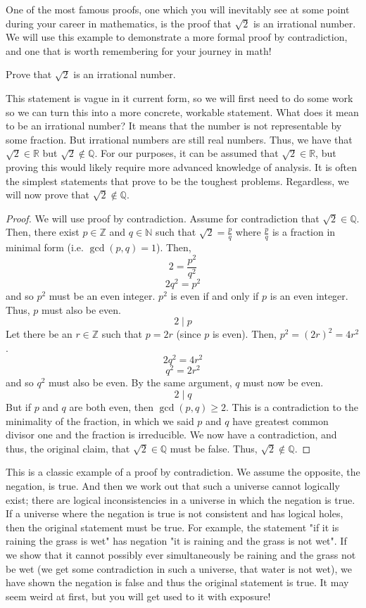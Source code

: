 One of the most famous proofs, one which you will inevitably see at some point during your career in mathematics, is the proof that $\sqrt{2}$ is an irrational number. We will use this example to demonstrate a more formal proof by contradiction, and one that is worth remembering for your journey in math!

\begin{example}
    Prove that $\sqrt{2}$ is an irrational number. 
\end{example}

This statement is vague in it current form, so we will first need to do some work so we can turn this into a more concrete, workable statement. What does it mean to be an irrational number? It means that the number is not representable by some fraction. But irrational numbers are still real numbers. Thus, we have that $\sqrt{2} \in \mathbb{R}$ but $\sqrt{2} \notin \mathbb{Q}$. For our purposes, it can be assumed that $\sqrt{2} \in \mathbb{R}$, but proving this would likely require more advanced knowledge of analysis. It is often the simplest statements that prove to be the toughest problems. Regardless, we will now prove that $\sqrt{2} \notin \mathbb{Q}$. 

\begin{proof}
We will use proof by contradiction. Assume for contradiction that $\sqrt{2} \in \mathbb{Q}$. Then, there exist $p \in \mathbb{Z}$ and $q \in \mathbb{N}$ such that $\sqrt{2} = \frac{p}{q}$ where $\frac{p}{q}$ is a fraction in minimal form (i.e. $\gcd(p, q) = 1$). Then,
\[
2 = \frac{p^2}{q^2}
\]
\[
2q^2 = p^2
\]
and so $p^2$ must be an even integer. $p^2$ is even if and only if $p$ is an even integer. Thus, $p$ must also be even.
\[
2 \mid p
\]
Let there be an $r \in \mathbb{Z}$ such that $p = 2r$ (since $p$ is even). Then, $p^2 = (2r)^2 = 4r^2$. 
\[
2q^2 = 4r^2
\]
\[
q^2 = 2r^2
\]
and so $q^2$ must also be even. By the same argument, $q$ must now be even.
\[
2 \mid q
\]
But if $p$ and $q$ are both even, then $\gcd(p, q) \geq 2$. This is a contradiction to the minimality of the fraction, in which we said $p$ and $q$ have greatest common divisor one and the fraction is irreducible. We now have a contradiction, and thus, the original claim, that $\sqrt{2} \in \mathbb{Q}$ must be false. Thus, $\sqrt{2} \notin \mathbb{Q}$.
\end{proof}

This is a classic example of a proof by contradiction. We assume the opposite, the negation, is true. And then we work out that such a universe cannot logically exist; there are logical inconsistencies in a universe in which the negation is true. If a universe where the negation is true is not consistent and has logical holes, then the original statement must be true. For example, the statement "if it is raining the grass is wet" has negation "it is raining and the grass is not wet". If we show that it cannot possibly ever simultaneously be raining and the grass not be wet (we get some contradiction in such a universe, that water is not wet), we have shown the negation is false and thus the original statement is true. It may seem weird at first, but you will get used to it with exposure!
 
